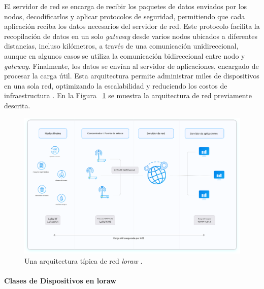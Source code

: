 El servidor de red se encarga de recibir los paquetes de datos enviados por los nodos, decodificarlos y aplicar protocolos de seguridad, permitiendo que cada aplicación reciba los datos necesarios del servidor de red. Este protocolo facilita la recopilación de datos en un solo \textit{gateway} desde varios nodos ubicados a diferentes distancias, incluso kilómetros, a través de una comunicación unidireccional, aunque en algunos casos se utiliza la comunicación bidireccional entre nodo y \textit{gateway}. Finalmente, los datos se envían al servidor de aplicaciones, encargado de procesar la carga útil. Esta arquitectura permite administrar miles de dispositivos en una sola red, optimizando la escalabilidad y reduciendo los costos de infraestructura \cite{doc_whatislorawan, bertoleti2019proyectos}. En la Figura ~\ref{fig:arquitectura} se muestra la arquitectura de red previamente descrita.

\begin{figure}[H]
\leavevmode
\begin{minipage}{\textwidth}
\begin{center}
\includegraphics[scale=0.22]{./capitulo_02/figures/architecture.png}
\caption{Una arquitectura típica de red \textit{\acrshort{loraw}} \cite{Lora3}. \label{fig:arquitectura}}
\end{center}
\end{minipage}
\end{figure}

\paragraph{Clases de Dispositivos en \acrshort{loraw}\\}

